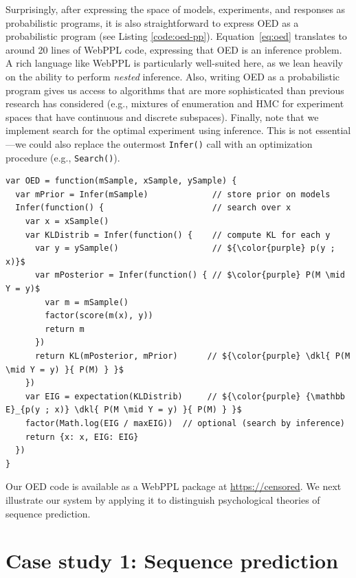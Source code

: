 \documentclass{article}
\newcommand{\dkl}{D_\mathrm{KL}\infdivx}
\newcommand{\ndg}[1]{\textcolor{Green}{[ndg: #1]}}
\begin{document}
Surprisingly, after expressing the space of models, experiments, and responses as probabilistic programs, it is also straightforward to express OED as a probabilistic program (see Listing \ref{code:oed-pp}).
Equation~\ref{eq:oed} translates to around 20 lines of WebPPL code, expressing that OED is an inference problem.
A rich language like WebPPL is particularly well-suited here, as we lean heavily on the ability to perform \emph{nested} inference.
Also, writing OED as a probabilistic program gives us access to algorithms that are more sophisticated than previous research has considered (e.g., mixtures of enumeration and HMC for experiment spaces that have continuous and discrete subspaces).
Finally, note that we implement search for the optimal experiment using inference.
This is not essential---we could also replace the outermost \lstinline|Infer()| call with an optimization procedure (e.g., \lstinline|Search()|).

\begin{lstlisting}[mathescape, label={code:oed-pp}, caption = {OED implementation. For clarity, we have omitted some book-keeping details.}]
var OED = function(mSample, xSample, ySample) {
  var mPrior = Infer(mSample)             // store prior on models
  Infer(function() {                      // search over x
    var x = xSample()
    var KLDistrib = Infer(function() {    // compute KL for each y
      var y = ySample()                   // ${\color{purple} p(y ; x)}$
      var mPosterior = Infer(function() { // $\color{purple} P(M \mid Y = y)$
        var m = mSample()
        factor(score(m(x), y))
        return m
      })
      return KL(mPosterior, mPrior)      // ${\color{purple} \dkl{ P(M \mid Y = y) }{ P(M) } }$
    })
    var EIG = expectation(KLDistrib)     // ${\color{purple} {\mathbb E}_{p(y ; x)} \dkl{ P(M \mid Y = y) }{ P(M) } }$
    factor(Math.log(EIG / maxEIG))  // optional (search by inference)
    return {x: x, EIG: EIG}
  })
}
\end{lstlisting}
Our OED code is available as a WebPPL package at \url{https://censored}. %
We next illustrate our system by applying it to distinguish psychological theories of sequence prediction.

\section{Case study 1: Sequence prediction}
\label{s:tutorial}
\end{document}
